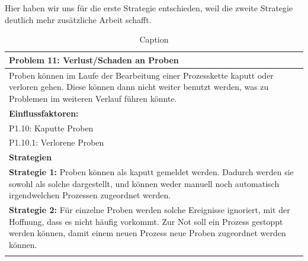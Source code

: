 \documentclass[enabledeprecatedfontcommands,fontsize=12pt,paper=a4,twoside]{scrartcl}
\begin{document}
Hier haben wir uns für die erste Strategie entschieden, weil die zweite Strategie deutlich mehr zusätzliche Arbeit schafft. \\

\begin{table}[H]
    \centering
    \begin{tabular}{|p{15cm}|}
    \hline

          \textbf{Problem 11:} Verlust/Schaden an Proben %
          \\ \hline
          Proben können im Laufe der Bearbeitung einer Prozesskette kaputt oder verloren gehen. Diese können dann nicht weiter benutzt werden, was zu Problemen im weiteren Verlauf führen könnte.
          \\ \hline
          \textbf{Einflussfaktoren: } \\
          P1.10: Kaputte Proben\\
          P1.10.1: Verlorene Proben \\
          \hline
          \textbf{Strategien} \\ \hline
          \textbf{Strategie 1:} Proben können als kaputt gemeldet werden. Dadurch werden sie sowohl als solche dargestellt, und können weder manuell noch automatisch irgendwelchen Prozessen zugeordnet werden. \\
          \textbf{Strategie 2:} Für einzelne Proben werden solche Ereignisse ignoriert, mit der Hoffnung, dass es nicht häufig vorkommt. Zur Not soll ein Prozess gestoppt werden können, damit einem neuen Prozess neue Proben zugeordnet werden können. \\
          \\ \hline
    \end{tabular}
    \caption{Caption}
    \label{tab:my_label}
\end{table}
\end{document}
